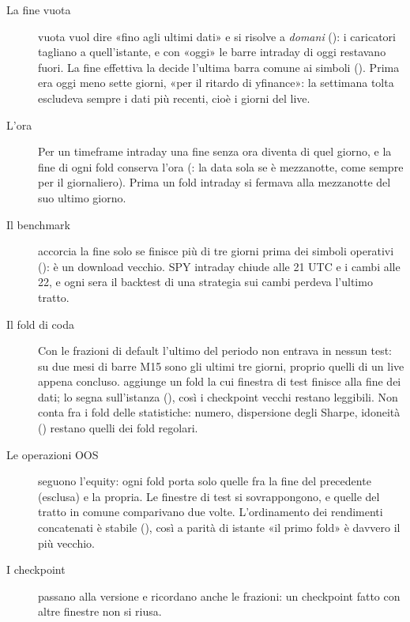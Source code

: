 \begin{description}
  \item[La fine vuota]  vuota vuol dire «fino agli ultimi
    dati» e si risolve a \emph{domani}
    (): i caricatori
    tagliano a quell'istante, e con «oggi» le barre intraday di oggi
    restavano fuori. La fine effettiva la decide l'ultima barra comune ai
    simboli (). Prima
    era oggi meno sette giorni, «per il ritardo di yfinance»: la settimana
    tolta escludeva sempre i dati più recenti, cioè i giorni del live.
  \item[L'ora] Per un timeframe intraday una fine senza ora diventa
     di quel giorno, e la fine di ogni fold conserva l'ora
    (: la data sola se è mezzanotte, come sempre per
    il giornaliero). Prima un fold intraday si fermava alla mezzanotte del
    suo ultimo giorno.
  \item[Il benchmark] accorcia la fine solo se finisce più di tre giorni
    prima dei simboli operativi (): è un
    download vecchio. SPY intraday chiude alle 21 UTC e i cambi alle 22, e
    ogni sera il backtest di una strategia sui cambi perdeva l'ultimo tratto.
  \item[Il fold di coda] Con le frazioni di default l'ultimo  del
    periodo non entrava in nessun test: su due mesi di barre M15 sono gli
    ultimi tre giorni, proprio quelli di un live appena concluso.
     aggiunge un fold la cui finestra di test
    finisce alla fine dei dati; lo segna  sull'istanza
    (), così i checkpoint vecchi restano leggibili. Non
    conta fra i fold delle statistiche: numero, dispersione degli Sharpe,
    idoneità () restano quelli dei fold
    regolari.
  \item[Le operazioni OOS] seguono l'equity: ogni fold porta solo quelle fra
    la fine del precedente (esclusa) e la propria. Le finestre di test si
    sovrappongono, e quelle del tratto in comune comparivano due volte.
    L'ordinamento dei rendimenti concatenati è stabile
    (), così a parità di istante «il primo fold» è
    davvero il più vecchio.
  \item[I checkpoint] passano alla versione  e ricordano anche le
    frazioni: un checkpoint fatto con altre finestre non si riusa.
\end{description}


